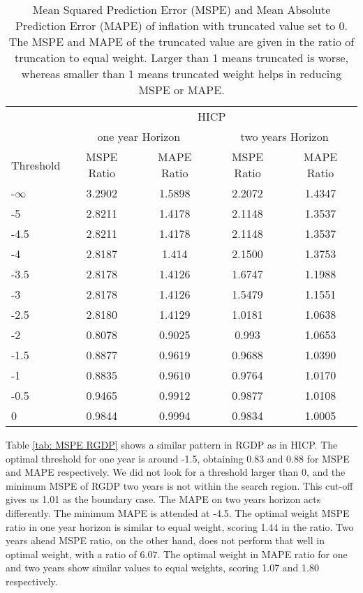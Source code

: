 \documentclass[11pt]{article}
\begin{document}
\begin{table}[!h]
	\centering
	\caption{Mean Squared Prediction Error (MSPE) and Mean Absolute Prediction Error (MAPE) of inflation with truncated value set to 0. The MSPE and MAPE of the truncated value are given in the ratio of truncation to equal weight. Larger than 1 means truncated is worse, whereas smaller than 1 means truncated weight helps in reducing MSPE or MAPE.}
	\label{tab: MSPE HICP}
	\begin{tabular}{lcccc}
		\hline\hline
		&                        \multicolumn{4}{c}{HICP}                         \\
		\cmidrule(lr){2-5}                              & \multicolumn{2}{c}{one year Horizon} & \multicolumn{2}{c}{two years Horizon} \\
		\cmidrule(lr){2-3} \cmidrule(lr){4-5}
		Threshold & MSPE Ratio &    MAPE Ratio    & MSPE Ratio &    MAPE Ratio    \\ \hline
		-$\infty$ & 3.2902 & 1.5898 & 2.2072 & 1.4347\\ 
		-5 & 2.8211 & 1.4178 & 2.1148 & 1.3537\\ 
		-4.5 & 2.8211 & 1.4178 & 2.1148 & 1.3537\\ 
		-4 & 2.8187 & 1.414 & 2.1500 & 1.3753\\ 
		-3.5 & 2.8178 & 1.4126 & 1.6747 & 1.1988\\ 
		-3 & 2.8178 & 1.4126 & 1.5479 & 1.1551\\ 
		-2.5 & 2.8180 & 1.4129 & 1.0181 & 1.0638\\ 
		-2 & 0.8078 & 0.9025 & 0.993 & 1.0653\\ 
		-1.5 & 0.8877 & 0.9619 & 0.9688 & 1.0390\\ 
		-1 & 0.8835 & 0.9610 & 0.9764 & 1.0170\\ 
		-0.5 & 0.9465 & 0.9912 & 0.9877 & 1.0108\\ 
		0 & 0.9844 & 0.9994 & 0.9834 & 1.0005\\ 		 \hline\hline
	\end{tabular}
\end{table}

Table \ref{tab: MSPE RGDP} shows a similar pattern in RGDP as in HICP. The optimal threshold for one year is around -1.5, obtaining 0.83 and 0.88 for MSPE and MAPE respectively. We did not look for a threshold larger than 0, and the minimum MSPE of RGDP two years is not within the search region. This cut-off gives us 1.01 as the boundary case. The MAPE on two years horizon acts differently. The minimum MAPE is attended at -4.5. The optimal weight MSPE ratio in one year horizon is similar to equal weight, scoring 1.44 in the ratio. Two years ahead MSPE ratio, on the other hand, does not perform that well in optimal weight, with a ratio of 6.07. The optimal weight in MAPE ratio for one and two years show similar values to equal weights, scoring 1.07 and 1.80 respectively.
\end{document}
